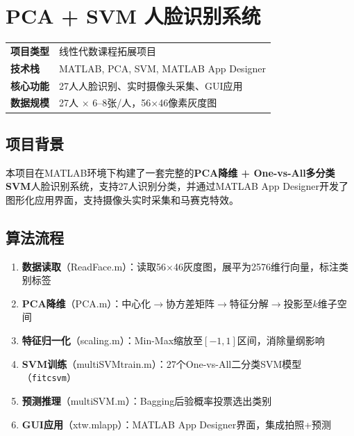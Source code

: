 \documentclass[12pt,a4paper]{ctexart}
\begin{document}
\newpage
\section{PCA + SVM 人脸识别系统}

\begin{infobox}[项目概况]
\begin{tabular}{ll}
\textbf{项目类型} & 线性代数课程拓展项目 \\
\textbf{技术栈}   & MATLAB, PCA, SVM, MATLAB App Designer \\
\textbf{核心功能} & 27人人脸识别、实时摄像头采集、GUI应用 \\
\textbf{数据规模} & 27人 $\times$ 6--8张/人，56$\times$46像素灰度图
\end{tabular}
\end{infobox}

\subsection{项目背景}

本项目在MATLAB环境下构建了一套完整的\textbf{PCA降维 + One-vs-All多分类SVM}人脸识别系统，支持27人识别分类，并通过MATLAB App Designer开发了图形化应用界面，支持摄像头实时采集和马赛克特效。

\subsection{算法流程}

\begin{enumerate}
    \item \textbf{数据读取}（ReadFace.m）：读取56$\times$46灰度图，展平为2576维行向量，标注类别标签
    \item \textbf{PCA降维}（PCA.m）：中心化$\to$协方差矩阵$\to$特征分解$\to$投影至$k$维子空间
    \item \textbf{特征归一化}（scaling.m）：Min-Max缩放至$[-1, 1]$区间，消除量纲影响
    \item \textbf{SVM训练}（multiSVMtrain.m）：27个One-vs-All二分类SVM模型（\texttt{fitcsvm}）
    \item \textbf{预测推理}（multiSVM.m）：Bagging后验概率投票选出类别
    \item \textbf{GUI应用}（xtw.mlapp）：MATLAB App Designer界面，集成拍照+预测
\end{enumerate}
\end{document}
